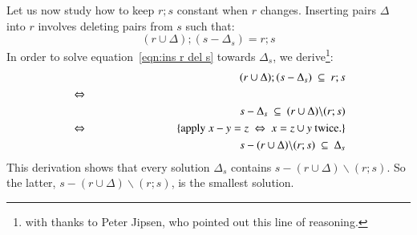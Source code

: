 \documentclass{elsarticle}
\begin{document}
	Let us now study how to keep $r;s$ constant when $r$ changes.
	Inserting pairs $\Delta$ into $r$ involves deleting pairs from $s$ such that:
\begin{equation}
(r\cup \Delta);(s-\Delta_s)=r;s\label{eqn:ins r del s}
\end{equation}
	In order to solve equation~\ref{eqn:ins r del s} towards $\Delta_s$,
	we derive\footnote{with thanks to Peter Jipsen, who pointed out this line of reasoning.}:
\begin{eqnarray}
&&(r\cup \Delta);(s-\Delta_s)\ \subs\ r;s\label{eqn:rs subs t by ins r del s}\\
&\Leftrightarrow&\nonumber\\
&&s-\Delta_s\ \subs\ (r\cup \Delta)\backslash(r;s)\nonumber\\
&\Leftrightarrow&\hspace{1in}\{\text{apply }x-y=z\ \Leftrightarrow\ x=z\cup y\text{ twice.}\}\nonumber\\
&&s-(r\cup \Delta)\backslash(r;s)\ \subs\ \Delta_s\nonumber
\end{eqnarray}
	This derivation shows that every solution $\Delta_s$ contains $s-(r\cup \Delta)\backslash(r;s)$.
	So the latter, $s-(r\cup \Delta)\backslash(r;s)$, is the smallest solution.
\end{document}
